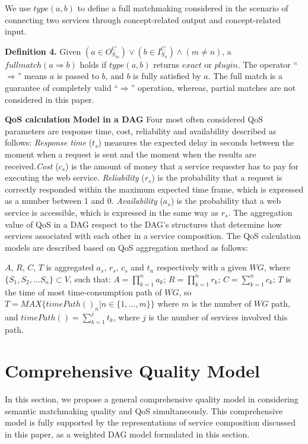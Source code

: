 \documentclass{llncs}
\begin{document}
We use $type(a, b)$ to define a full matchmaking considered in the scenario of connecting two services through concept-related output and concept-related input.

\textbf{Definition 4.} Given $(a \in O^{C}_{S_m}) \vee (b \in I^{C}_{S_n}) \wedge (m \neq n) $, a $full match(a \Rightarrow b)$ holds if $type(a, b)$ returns $exact$ or $plugin$. The operator ``$ \Rightarrow$'' means $a$ is passed to $b$, and $b$ is fully satisfied by $a$. The full match is a guarantee of completely valid  ``$ \Rightarrow$'' operation, whereas, partial matches are not considered in this paper.
\vspace{0.3cm}

\textbf{QoS calculation Model in a DAG}
Four most often considered QoS parameters \cite{zeng2003quality} are response time, cost, reliability and availability described as follows: \textit{Response time} ($t_s$) measures the expected delay in seconds between the moment when a request is sent and the moment when the results are received.\textit{Cost} ($c_s$) is the amount of money that a service requester has to pay for executing the web service. \textit{Reliability} ($r_s$) is the probability that a request is correctly responded within the maximum expected time frame, which is expressed as a number between 1 and 0. \textit{Availability} ($a_s$) is the probability that a web service is accessible, which is expressed in the same way as $r_s$. The aggregation value of QoS in a DAG respect to the DAG's structures that determine how services associated with each other in a service composition. The QoS calculation models are described based on QoS aggregation method \cite{da2015graphevol} as follows:


$A$, $R$, $C$, $T$ is aggregated $a_s$, $r_s$, $c_s$ and $t_n$ respectively with a given $WG$, where  $\{S_1, S_2, ... S_n\} \subset V$, such that: $A=\prod\limits^n_{k=1}a_k
$; $R=\prod\limits^n_{k=1}r_k$; $C=\sum\limits^n_{k=1}c_k$; $T$ is the time of most time-consumption path of $WG$, so $T = MAX \{timePath()_n |n\in\{1,\ldots,m\}\}$ where $m$ is the number of $WG$ path, and $timePath() = \sum\limits^j_{k=1}t_k$, where $j$ is the number of services involved this path.

\section{Comprehensive Quality Model}\label{Comprehensive_Quality_Model}

In this section, we propose a general comprehensive quality model in considering semantic matchmaking quality and QoS simultaneously. This comprehensive model is fully supported by the representations of service composition discussed in this paper, as a weighted DAG model formulated in this section.
\end{document}

